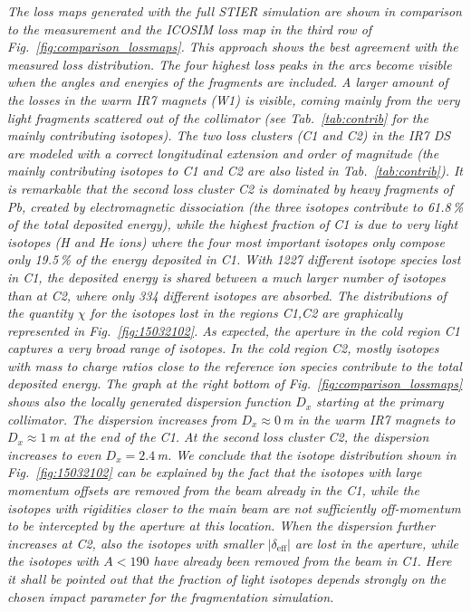 \textit{The loss maps generated with the full STIER simulation are shown in comparison to the measurement and the ICOSIM loss map in the third row of Fig.~\ref{fig:comparison_lossmaps}. This approach shows the best agreement with the measured loss distribution. The four highest loss peaks in the arcs become visible when the angles and energies of the fragments are included. 
%
A larger amount of the losses in the warm IR7 magnets (W1) is visible, coming mainly from the very light fragments scattered out of the collimator (see Tab.~\ref{tab:contrib} for the mainly contributing isotopes). The two loss clusters (C1 and C2) in the IR7 DS are modeled with a correct longitudinal extension and order of magnitude (the mainly contributing isotopes to C1 and C2 are also listed in Tab.~\ref{tab:contrib}). It is remarkable that the second loss cluster C2 is dominated by heavy fragments of Pb, created by electromagnetic dissociation (the three isotopes contribute to 61.8\,\% of the total deposited energy), while the highest fraction of C1 is due to very light isotopes (H and He ions) where the four most important isotopes only compose only 19.5\,\% of the energy deposited in C1. With 1227 different isotope species lost in C1, the deposited energy is shared between a much larger number of isotopes than at C2, where only 334 different isotopes are absorbed. 
%
The distributions of the quantity $\chi$ for the isotopes lost in the regions C1,C2 are graphically represented in Fig.~\ref{fig:15032102}. As expected, the aperture in the cold region C1 captures a very broad range of isotopes. In the cold region C2, mostly isotopes with mass to charge ratios close to the reference ion species contribute to the total deposited energy. 
%
The graph at the right bottom of Fig.~\ref{fig:comparison_lossmaps} shows also the locally generated dispersion function $D_x$ starting at the primary collimator. The dispersion increases from $D_x\approx0\,$m in the warm IR7 magnets to $D_x \approx 1\,$m at the end of the C1. At the second loss cluster C2, the dispersion increases to even $D_x=2.4\,$m. We conclude that the isotope distribution shown in Fig.~\ref{fig:15032102} can be explained by the fact that the isotopes with large momentum offsets are removed from the beam already in the C1, while the isotopes with rigidities closer to the main beam are not sufficiently off-momentum to be intercepted by the aperture at this location. When the dispersion further increases at C2, also the isotopes with smaller $|\delta_\text{eff}|$ are lost in the aperture, while the isotopes with $A<190$ have already been removed from the beam in C1. Here it shall be pointed out that the fraction of light isotopes depends strongly on the chosen impact parameter for the fragmentation simulation.}



